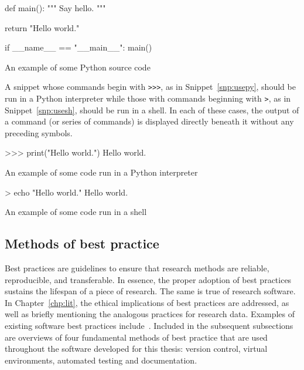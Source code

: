 \begin{listing}[htbp]
\begin{sourcepy}
def main():
    """ Say hello. """

    return "Hello world."

if __name__ == "__main__":
    main()
\end{sourcepy}
\caption{An example of some Python source code}\label{snp:source}
\end{listing}

A snippet whose commands begin with \texttt{>>>}, as in
Snippet~\ref{snp:usepy}, should be run in a Python interpreter while those with
commands beginning with \texttt{>}, as in Snippet~\ref{snp:usesh},
should be run in a shell. In each of these cases, the output of a command (or
series of commands) is displayed directly beneath it without any preceding
symbols.

\begin{listing}[htbp]
\begin{usagepy}
>>> print("Hello world.")
Hello world.

\end{usagepy}
\caption{An example of some code run in a Python interpreter}\label{snp:usepy}
\end{listing}

\begin{listing}[htbp]
\begin{usagesh}
> echo "Hello world."
Hello world.
\end{usagesh}
\caption{An example of some code run in a shell}\label{snp:usesh}
\end{listing}

\subsection{Methods of best practice}

Best practices are guidelines to ensure that research methods are reliable,
reproducible, and transferable. In essence, the proper adoption of best
practices sustains the lifespan of a piece of research. The same is true of
research software. In Chapter~\ref{chp:lit}, the ethical implications of best
practices are addressed, as well as briefly mentioning the analogous practices
for research data. Examples of existing software best practices
include~\cite{Aberdour2007,Benureau2018,Jimenez2017,Wilson2014}. Included in the
subsequent subsections are overviews of four fundamental methods of best
practice that are used throughout the software developed for this thesis:
version control, virtual environments, automated testing and documentation.

